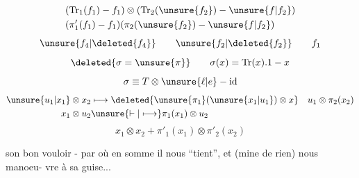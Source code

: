\[
\begin{aligned}
&(\operatorname{Tr}_1(f_1)-f_1)\otimes(\operatorname{Tr}_2(\unsure{f_2})-\unsure{f|f_2})\\
&(\pi'_1(f_1)-f_1)(\pi_2(\unsure{f_2})-\unsure{f|f_2})
\end{aligned}
\]
\[
\unsure{f_4|\deleted{f_4}}\qquad\unsure{f_2|\deleted{f_2}}\qquad f_1
\]
\[
\deleted{\sigma=\unsure{\pi}}\qquad\sigma(x)=\operatorname{Tr}(x).1-x
\]
\[
\sigma\equiv T\otimes\unsure{\ell|e}-\mathrm{id}
\]
\[
\begin{aligned}
\unsure{u_1|x_1}\otimes x_2&\longmapsto\deleted{\unsure{\pi_1}(\unsure{x_1|u_1})\otimes x}\quad u_1\otimes\pi_2(x_2)\\
x_1\otimes u_2&\unsure{\vdash|\longmapsto}\pi_1(x_1)\otimes u_2
\end{aligned}
\]
\[
\boxed{x_1\otimes x_2+\pi'_1(x_1)\otimes\pi'_2(x_2)}
\]

son bon vouloir - par où en somme il nous ``tient'', et (mine de rien) nous manoeu-\linebreak
vre à sa guise...

